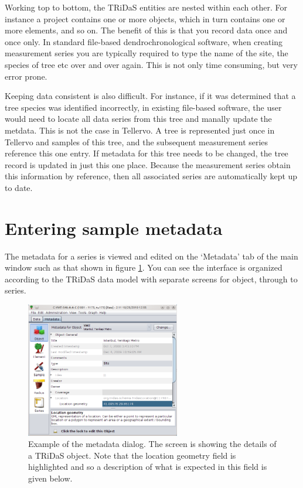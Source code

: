 Working top to bottom, the TRiDaS entities are nested within each other.  For instance a project contains one or more objects, which in turn contains one or more elements, and so on.  The benefit of this is that you record data once and once only.  In standard file-based dendrochronological software, when creating measurement series you are typically required to type the name of the site, the species of tree etc over and over again.  This is not only time consuming, but very error prone.  

Keeping data consistent is also difficult.  For instance, if it was determined that a tree species was identified incorrectly, in existing file-based software, the user would need to locate all data series from this tree and manally update the metdata.  This is not the case in Tellervo.  A tree is represented just once in Tellervo and samples of this tree, and the subsequent measurement series reference this one entry.  If metadata for this tree needs to be changed, the tree record is updated in just this one place.  Because the measurement series obtain this information by reference, then all associated series are automatically kept up to date.

\section{Entering sample metadata}
The metadata for a series is viewed and edited on the `Metadata' tab of the main window such as that shown in figure \ref{fig:metadata}.  You can see the interface is organized according to the TRiDaS data model with separate screens for object, through to series.  

\begin{figure}
\centering
\includegraphics[width=0.6\textwidth]{Images/metadata.png}
\caption{Example of the metadata dialog.  The screen is showing the details of a TRiDaS object.  Note that the location geometry field is highlighted and so a description of what is expected in this field is given below.} 
\label{fig:metadata}
\end{figure}

